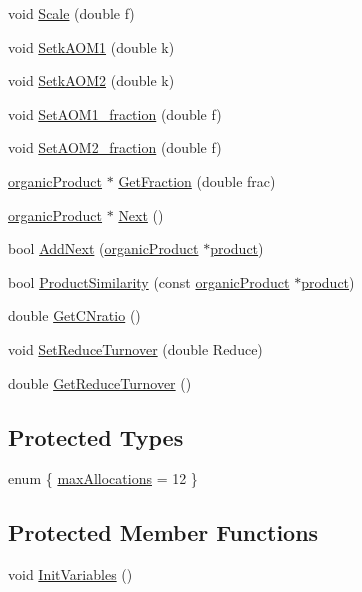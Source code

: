 \begin{DoxyCompactItemize}
\item 
void \hyperlink{classorganic_product_aafe75e4ad827977c8f3679850581d19a}{Scale} (double f)
\item 
void \hyperlink{classorganic_product_ad126b4d58c7007da80a68cc60296c337}{SetkAOM1} (double k)
\item 
void \hyperlink{classorganic_product_a04807d30cde0dc4fee6868c17599b1f1}{SetkAOM2} (double k)
\item 
void \hyperlink{classorganic_product_accc8b9ad540adb9a9e22a1c2fcf53c78}{SetAOM1\_\-fraction} (double f)
\item 
void \hyperlink{classorganic_product_a7ecff65aede65e22d43835131881f495}{SetAOM2\_\-fraction} (double f)
\item 
\hyperlink{classorganic_product}{organicProduct} $\ast$ \hyperlink{classorganic_product_ab9f2dcb358bab6290b9fc01af1992d74}{GetFraction} (double frac)
\item 
\hyperlink{classorganic_product}{organicProduct} $\ast$ \hyperlink{classorganic_product_ae07714fe698c3da48f1840242ffe7a04}{Next} ()
\item 
bool \hyperlink{classorganic_product_a19db425e68324fe376be404cb52d1ba6}{AddNext} (\hyperlink{classorganic_product}{organicProduct} $\ast$\hyperlink{classproduct}{product})
\item 
bool \hyperlink{classorganic_product_aeafa792e066d2bfa04029019c94d2d6c}{ProductSimilarity} (const \hyperlink{classorganic_product}{organicProduct} $\ast$\hyperlink{classproduct}{product})
\item 
double \hyperlink{classorganic_product_abec5af127d3ff1f687ddec55f0d7a827}{GetCNratio} ()
\item 
void \hyperlink{classorganic_product_abe76058995d85817daf3bcf02e7f24bb}{SetReduceTurnover} (double Reduce)
\item 
double \hyperlink{classorganic_product_a6551379aedaae4fab19dfc9c985f1cb7}{GetReduceTurnover} ()
\end{DoxyCompactItemize}
\subsection*{Protected Types}
\begin{DoxyCompactItemize}
\item 
enum \{ \hyperlink{classorganic_product_a7d49b54ed2c7f92fce2e3f35115e1c22a061bb9fd136515aaad1613f6d80923a2}{maxAllocations} = 12
 \}
\end{DoxyCompactItemize}
\subsection*{Protected Member Functions}
\begin{DoxyCompactItemize}
\item 
void \hyperlink{classorganic_product_a82afaea76d84157abc874f5d87067ad5}{InitVariables} ()
\end{DoxyCompactItemize}
